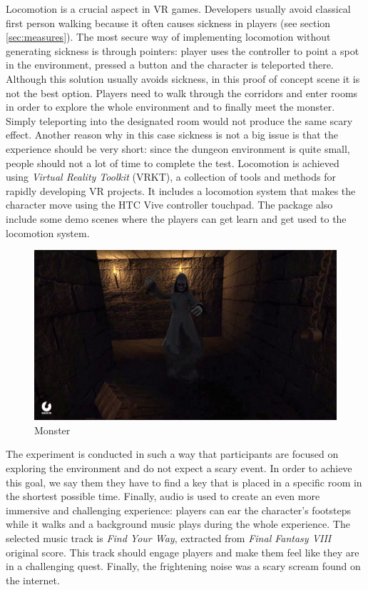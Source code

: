 \documentclass[binding=0.6cm,LaM]{sapthesis}
\begin{document}
Locomotion is a crucial aspect in VR games. Developers usually avoid classical first person walking because it often causes sickness in players (see section \ref{sec:measures}). The most secure way of implementing locomotion without generating sickness is through pointers: player uses the controller to point a spot in the environment, pressed a button and the character is teleported there. Although this solution usually avoids sickness, in this proof of concept scene it is not the best option. Players need to walk through the corridors and enter rooms in order to explore the whole environment and to finally meet the monster. Simply teleporting into the designated room would not produce the same scary effect. Another reason why in this case sickness is not a big issue is that the experience should be very short: since the dungeon environment is quite small, people should not a lot of time to complete the test. Locomotion is achieved using \textit{Virtual Reality Toolkit} (VRKT), a collection of tools and methods for rapidly developing VR projects. It includes a locomotion system that makes the character move using the HTC Vive controller touchpad. The package also include some demo scenes where the players can get learn and get used to the locomotion system.

\begin{figure}[h]
\centering
\includegraphics[scale=.28]{images/monster2}
\caption{Monster}
\end{figure}

The experiment is conducted in such a way that participants are focused on exploring the environment and do not expect a scary event. In order to achieve this goal, we say them they have to find a key that is placed in a specific room in the shortest possible time. Finally, audio is used to create an even more immersive and challenging experience: players can ear the character's footsteps while it walks and a background music plays during the whole experience. The selected music track is \textit{Find Your Way}, extracted from \textit{Final Fantasy VIII} original score. This track should engage players and make them feel like they are in a challenging quest. Finally, the frightening noise was a scary scream found on the internet.
\end{document}
